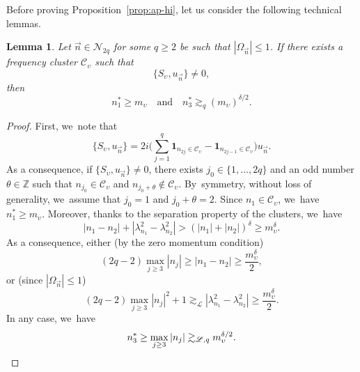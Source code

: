 \documentclass[10pt,a4paper]{amsart}
\theoremstyle{plain}
\newtheorem{lemma}[theorem]{Lemma}
\theoremstyle{definition}
\newcommand{\1}{\mathbf{1}}
\begin{document}
Before proving Proposition~\ref{prop:ap-hi}, let us consider the following technical lemmas.

\begin{lemma}\label{lem:mu3} Let $\vec{n}\in\mathcal{N}_{2q}$ for some $q\geq2$ be such that $|\Omega_{\vec{n}}|\leq 1$. If there exists a frequency cluster $\mathscr{C}_{\upsilon}$ such that
\[
\{ S_{\upsilon}, u_{\vec{n}}\} \neq 0,
\]
then
\[
n_{1}^{\ast}\geq m_\upsilon \quad \mathrm{and} \quad n_{3}^{\ast}\gtrsim_q (m_\upsilon)^{\delta/2}.
\]
\end{lemma}

\begin{proof}
First, we~note that
\[
\{ S_{\upsilon}, u_{\vec{n}}\} = 2i \biggl(\sum_{j=1}^q \mathbf{1}_{n_{2j} \in \mathscr{C}_\upsilon } - \mathbf{1}_{n_{2j-1} \in \mathscr{C}_\upsilon } \biggr) u_{\vec{n}}.
\]
As a consequence, if $\{ S_{\upsilon}, u_{\vec{n}}\} \neq 0$, there exists $j_0 \in \{1,\dots,2q\}$ and an odd number $\theta\in \mathbb{Z}$ such that $n_{j_0} \in \mathscr{C}_\upsilon$ and $n_{j_0 + \theta} \notin \mathscr{C}_\upsilon$. By~symmetry, without loss of generality, we~assume that $j_0=1$ and $j_0 + \theta= 2$. Since $n_1 \in \mathscr{C}_\upsilon$, we~have $n_{1}^{\ast}\geq m_\upsilon$. Moreover, thanks to the separation property of the clusters, we~have
\[
|n_1-n_2| + |\lambda_{n_{1}}^{2}-\lambda_{n_{2}}^{2}| > (|n_1|+|n_2|)^{\delta} \geq m_\upsilon^{\delta}.
\]
As a consequence, either (by the zero momentum condition)
\[
(2q-2) \max_{j\geq 3} |n_j| \geq |n_1-n_2| \geq \frac{m_\upsilon^{\delta}}2,
\]
or (since $|\Omega_{\vec{n}}|\leq 1$)
\[
(2q-2) \max_{j\geq 3} |n_j|^2 + 1 \gtrsim_{\mathscr{L}} |\lambda_{n_{1}}^{2}-\lambda_{n_{2}}^{2}| \geq \frac{m_\upsilon^{\delta}}2.
\]
In any case, we~have
\[
n_3^* \geq \max_{j\geq 3} | n_j | \gtrsim_{\mathscr{L},q} m_\upsilon^{\delta/2}.\qedhere
\]
\end{proof}
\end{document}
